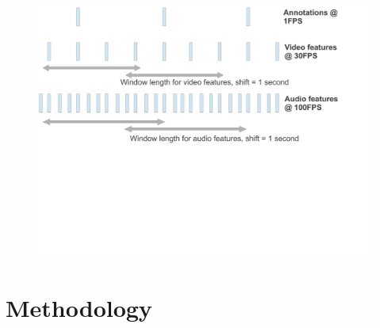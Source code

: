 \documentclass{article}
\begin{document}
\begin{figure}[t]
\centering
\includegraphics [trim=0cm 9cm 3cm 0cm,clip=true,scale=.355] {images/features_fig.pdf} 
\caption{}
\label{back_fig}
\end{figure}



\section{Methodology}
\end{document}
